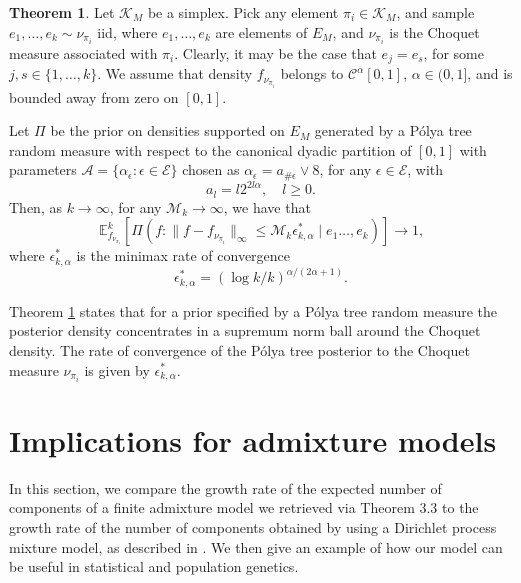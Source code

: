 \documentclass[12pt, reqno]{amsart}
\theoremstyle{definition}
\newtheorem{theorem}{Theorem}%
\begin{document}
\begin{theorem}\label{thm1}
Let $\mathcal{K}_M$ be a simplex. Pick any element $\pi_i \in \mathcal{K}_M$, and sample $e_1,\ldots,e_k \sim \nu_{\pi_i}$ iid, where  $e_1,\ldots,e_k$ are elements of $E_M$, and $\nu_{\pi_i}$ is the Choquet measure associated with $\pi_i$. Clearly, it may be the case that $e_j=e_s$, for some $j,s \in \{1,\ldots,k\}$. We assume that density $f_{\nu_{\pi_i}}$ belongs to $\mathcal{C}^\alpha[0,1]$, $\alpha \in (0,1]$, and is bounded away from zero on $[0,1]$.

Let $\Pi$ be the prior on densities supported on $E_M$ generated  by a P\'olya tree random measure with respect to the canonical dyadic partition of $[0,1]$ with parameters $\mathcal{A}=\{ \alpha_\epsilon : \epsilon \in \mathcal{E} \}$ chosen as $\alpha_\epsilon=a_{\#\epsilon} \vee 8$, for any $\epsilon \in \mathcal{E}$, with
$$a_l=l2^{2l\alpha} , \quad l \geq 0.$$
Then, as $k \rightarrow \infty$, for any $\mathcal{M}_k \rightarrow \infty$, we have that
\begin{equation}\label{polya_speed}
\mathbb{E}^k_{f_{\nu_{\pi_i}}} \left[ \Pi \left( f: \|f - f_{\nu_{\pi_i}}\|_{\infty} \leq \mathcal{M}_k \epsilon^*_{k,\alpha} \mid e_1\ldots,e_k \right) \right] \rightarrow 1 \text{,}
\end{equation}
where $\epsilon^*_{k,\alpha}$ is the minimax rate of convergence
$$\epsilon^*_{k,\alpha} = (\log k/{k} )^{{\alpha}/(2\alpha +1)}.$$
\end{theorem}



Theorem \ref{thm1} states that for a  prior specified by a P\'olya tree random measure the posterior density concentrates in a supremum norm ball around the Choquet density. The rate of convergence of the P\'olya tree posterior to the Choquet measure $\nu_{\pi_i}$ is given by $\epsilon^*_{k,\alpha}$.



\section{Implications for admixture models} 
In this section, we compare the growth rate of the expected number of components of a finite admixture model we retrieved via Theorem 3.3 to the growth rate of the number of components obtained by using a Dirichlet process mixture model, as described in \cite{li}. We then give an example of how our model can be useful in statistical and population genetics.
\end{document}
